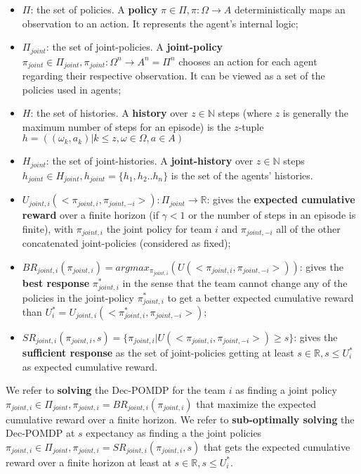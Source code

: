 \documentclass{ecai}
\begin{document}
\begin{itemize}

    \item $\Pi$: the set of policies. A \textbf{policy} $\pi \in \Pi, \pi: \Omega \rightarrow A$ deterministically maps an observation to an action. It represents the agent's internal logic;
    \item $\Pi_{joint}$: the set of joint-policies. A \textbf{joint-policy} $\pi_{joint} \in \Pi_{joint}, \pi_{joint}: \Omega^n \rightarrow A^n = \Pi^n$ chooses an action for each agent regarding their respective observation. It can be viewed as a set of the policies used in agents;
    \item $H$: the set of histories. A \textbf{history} over $z \in \mathbb{N}$ steps (where $z$ is generally the maximum number of steps for an episode) is the $z$-tuple $h = ((\omega_{k}, a_{k}) | k \leq z, \omega \in \Omega, a \in A)$
    \item $H_{joint}$: the set of joint-histories. A \textbf{joint-history} over $z \in \mathbb{N}$ steps $h_{joint} \in H_{joint}, h_{joint} = \{h_1,h_2..h_n\}$ is the set of the agents' histories.
    \item $U_{joint,i}(<\pi_{joint,i}, \pi_{joint,-i}>): \Pi_{joint} \rightarrow \mathbb{R}$: gives the \textbf{expected cumulative reward} over a finite horizon (if $\gamma < 1$ or the number of steps in an episode is finite), with $\pi_{joint,i}$ the joint policy for team $i$ and $\pi_{joint,-i}$ all of the other concatenated joint-policies (considered as fixed);
    \item $BR_{joint,i}(\pi_{joint,i}) = argmax_{\pi_{joint,i}}(U(<\pi_{joint,i},\pi_{joint,-i}>))$: gives the \textbf{best response} $\pi_{joint,i}^*$ in the sense that the team cannot change any of the policies in the joint-policy $\pi_{joint,i}^*$ to get a better expected cumulative reward than $U_i^* = U_{joint,i}(<\pi_{joint,i}^*, \pi_{joint,-i}>)$;
    \item $SR_{joint,i}(\pi_{joint,i}, s) = \{\pi_{joint,i} | U(<\pi_{joint,i},\pi_{joint,-i}>) \geq s\}$: gives the \textbf{sufficient response} as the set of joint-policies getting at least $s \in \mathbb{R}, s \leq U_i^*$ as expected cumulative reward.
\end{itemize}

We refer to \textbf{solving} the Dec-POMDP for the team $i$ as finding a joint policy $\pi_{joint,i} \in \Pi_{joint}, \pi_{joint,i} = BR_{joint,i}(\pi_{joint,i})$ that maximize the expected cumulative reward over a finite horizon.
We refer to \textbf{sub-optimally solving} the Dec-POMDP at $s$ expectancy as finding a the joint policies $\pi_{joint,i} \in \Pi_{joint}, \pi_{joint,i} = SR_{joint,i}(\pi_{joint,i}, s)$ that gets the expected cumulative reward over a finite horizon at least at $s \in \mathbb{R}, s \leq U_i^*$.
\end{document}

